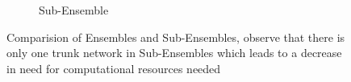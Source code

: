 \begin{figure}[H]
\begin{subfigure}[b]{0.495\textwidth}
             \caption{Sub-Ensemble}
             \label{fig:Sub-Ensemble}
         \end{subfigure}
            \caption[Ensemble vs Sub-Ensemble]{Comparision of Ensembles and Sub-Ensembles, observe that there is only one trunk network in Sub-Ensembles which leads to a decrease in need for computational resources needed \cite[p.2]{ValdenegroToro2019}}
    \end{figure}
    

